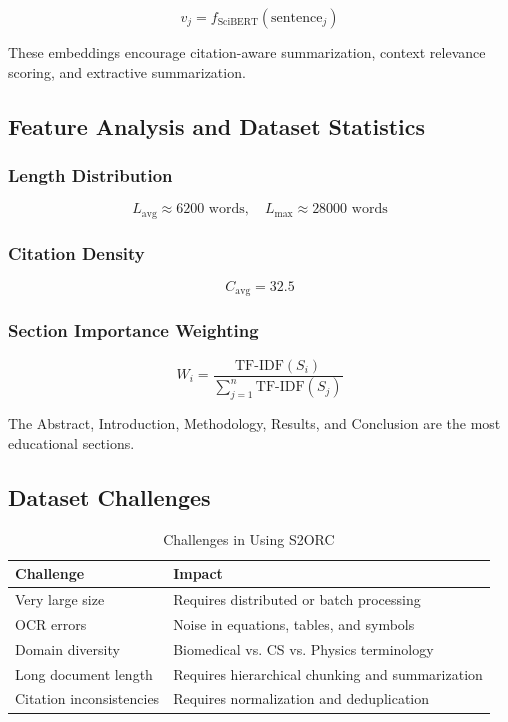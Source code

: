 \documentclass[conference]{IEEEtran}
\begin{document}
\[
v_j = f_{\text{SciBERT}}(\text{sentence}_j)
\]

These embeddings encourage citation-aware summarization, context relevance scoring, and extractive summarization.

\subsection{Feature Analysis and Dataset Statistics}

\subsubsection{Length Distribution}

\[
L_{\text{avg}} \approx 6200 \text{ words}, \quad
L_{\text{max}} \approx 28000 \text{ words}
\]

\subsubsection{Citation Density}

\[
C_{\text{avg}} = 32.5
\]

\subsubsection{Section Importance Weighting}

\[
W_i = \frac{\text{TF-IDF}(S_i)}
{\sum_{j=1}^{n} \text{TF-IDF}(S_j)}
\]

The Abstract, Introduction, Methodology, Results, and Conclusion are the most educational sections.

\subsection{Dataset Challenges}

\begin{table}[h]
\centering
\caption{Challenges in Using S2ORC}
\label{tab:s2orc_challenges}
\begin{tabular}{|l|p{5cm}|}
\hline
\textbf{Challenge} & \textbf{Impact} \\ \hline
Very large size & Requires distributed or batch processing \\ \hline
OCR errors & Noise in equations, tables, and symbols \\ \hline
Domain diversity & Biomedical vs. CS vs. Physics terminology \\ \hline
Long document length & Requires hierarchical chunking and summarization \\ \hline
Citation inconsistencies & Requires normalization and deduplication \\ \hline
\end{tabular}
\end{table}
\end{document}
